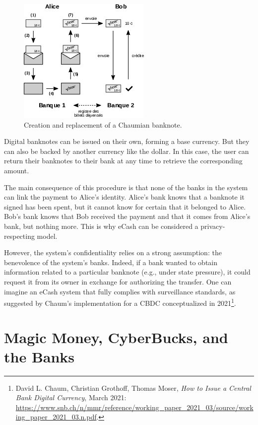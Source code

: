 \documentclass[
  a5paper,
  smalldemyvopaper,10pt,twoside,onecolumn,openright,extrafontsizes,hidelinks]{memoir}
\begin{document}
\begin{figure}[H]

{\centering \includegraphics{chapters/img/chaumian-ecash.png}

}

\caption{Creation and replacement of a Chaumian banknote.}

\end{figure}%

Digital banknotes can be issued on their own, forming a base currency.
But they can also be backed by another currency like the dollar. In this
case, the user can return their banknotes to their bank at any time to
retrieve the corresponding amount.

The main consequence of this procedure is that none of the banks in the
system can link the payment to Alice's identity. Alice's bank knows that
a banknote it signed has been spent, but it cannot know for certain that
it belonged to Alice. Bob's bank knows that Bob received the payment and
that it comes from Alice's bank, but nothing more. This is why eCash can
be considered a privacy-respecting model.

However, the system's confidentiality relies on a strong assumption: the
benevolence of the system's banks. Indeed, if a bank wanted to obtain
information related to a particular banknote (e.g., under state
pressure), it could request it from its owner in exchange for
authorizing the transfer. One can imagine an eCash system that fully
complies with surveillance standards, as suggested by Chaum's
implementation for a CBDC conceptualized in 2021\footnote{David L.
  Chaum, Christian Grothoff, Thomas Moser, \emph{How to Issue a Central
  Bank Digital Currency}, March 2021:
  \url{https://www.snb.ch/n/mmr/reference/working_paper_2021_03/source/working_paper_2021_03.n.pdf}.}.

\section*{Magic Money, CyberBucks, and the
Banks}\label{magic-money-cyberbucks-and-the-banks}
\end{document}
